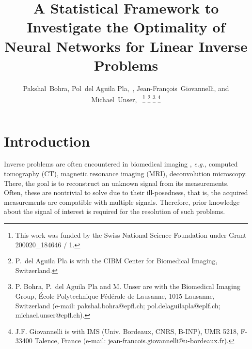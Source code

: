 \documentclass[journal]{IEEEtran}
\begin{document}
\IEEEoverridecommandlockouts


\title{A Statistical Framework to Investigate the Optimality of Neural Networks for Linear Inverse Problems}

\author{Pakshal~Bohra, Pol~{del Aguila Pla},~,
Jean-Fran\c{c}ois~Giovannelli, and Michael~Unser,~
\thanks{This work was funded by the Swiss National Science Foundation under
Grant 200020\_184646 / 1.}
\thanks{P.~{del Aguila Pla} is with the CIBM Center for Biomedical Imaging,
Switzerland.}
\thanks{P. Bohra, P.~{del Aguila Pla} and M. Unser are with the Biomedical
Imaging Group, \'{E}cole Polytechnique F\'{e}d\'{e}rale de Lausanne, 1015
Lausanne, Switzerland (e-mail: pakshal.bohra@epfl.ch;
pol.delaguilapla@eplf.ch; michael.unser@epfl.ch).}
\thanks{J.F. Giovannelli is with IMS (Univ. Bordeaux, CNRS, B-INP), UMR 5218,
F-33400 Talence, France (e-mail: jean-francois.giovannelli@u-bordeaux.fr).
}}%








\maketitle

\begin{abstract}
    
\end{abstract}
\begin{IEEEkeywords}
    
\end{IEEEkeywords}



\section{Introduction}\label{sec:intro}
Inverse problems are often encountered in biomedical imaging \cite{unser2019biomedical}, \textit{e.g.,} computed tomography (CT), magnetic resonance imaging (MRI), deconvolution microscopy. There, the goal is to reconstruct an unknown signal from its measurements. Often, these are nontrivial to solve due to their ill-posedness, that is, the acquired measurements are compatible with multiple signals. Therefore, prior knowledge about the signal of interest is required for the resolution of such problems.   
\end{document}
